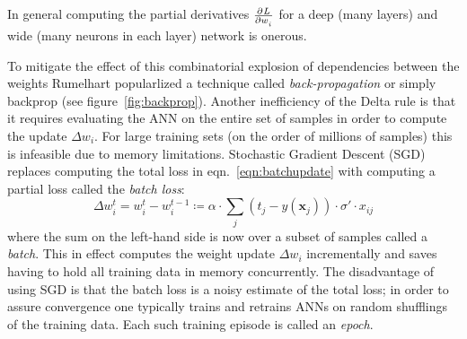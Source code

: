 In general computing the partial derivatives \(\pd{L}{w_i}\) for a deep (many layers) and wide (many neurons in each layer) network is onerous.
%

To mitigate the effect of this combinatorial explosion of dependencies between the weights Rumelhart \etal\cite{rumelhart1988learning} popularlized a technique called \textit{back-propagation} or simply backprop (see figure~\ref{fig:backprop}).
%
Another inefficiency of the Delta rule is that it requires evaluating the ANN on the entire set of samples in order to compute the update \(\Delta w_i\).
%
For large training sets (on the order of millions of samples) this is infeasible due to memory limitations.
%
Stochastic Gradient Descent (SGD) replaces computing the total loss in eqn.~\eqref{eqn:batchupdate} with computing a partial loss called the \textit{batch loss}:
\begin{equation}
    \Delta w_i^t = w_i^t - w_i^{t-1} \coloneqq \alpha \cdot \sum_j (t_j-y(\mathbf{x}_j))\cdot \sigma'\cdot x_{ij}
    \label{eqn:sgd}
\end{equation}
where the sum on the left-hand side is now over a subset of samples called a \textit{batch}.
%
This in effect computes the weight update \(\Delta w_i\) incrementally and saves having to hold all training data in memory concurrently.
%
The disadvantage of using SGD is that the batch loss is a noisy estimate of the total loss; in order to assure convergence one typically trains and retrains ANNs on random shufflings of the training data.
%
Each such training episode is called an \textit{epoch}.
%
